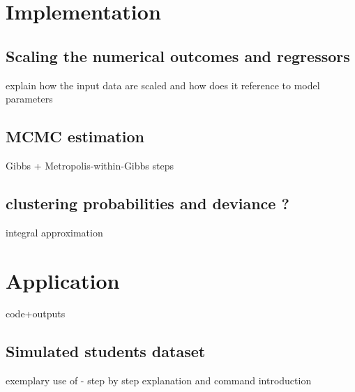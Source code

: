 \section{Implementation}\label{implementation}

\subsection{Scaling the numerical outcomes and regressors}\label{scaling-the-numerical-outcomes-and-regressors}

explain how the input data are scaled and how does it reference to model parameters

\subsection{MCMC estimation}\label{mcmc-estimation}

Gibbs + Metropolis-within-Gibbs steps

\subsection{clustering probabilities and deviance ?}\label{clustering-probabilities-and-deviance}

integral approximation

\section{Application}\label{application}

code+outputs

\subsection{Simulated students dataset}\label{simulated-students-dataset}

exemplary use of  - step by step explanation and command introduction


